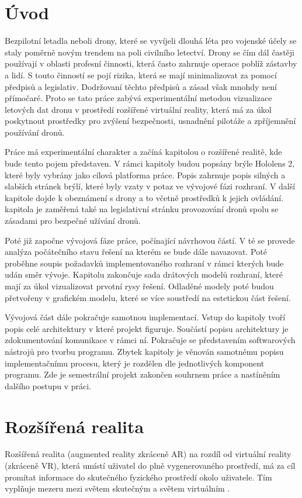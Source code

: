 
\chapter{Úvod}
Bezpilotní letadla neboli drony, které se vyvíjeli dlouhá léta pro vojenské účely se staly poměrně novým trendem na poli civilního letectví. Drony se čím dál častěji používají v oblasti profesní činnosti, která často zahrnuje operace poblíž zástavby a lidí. S touto činností se pojí rizika, která se mají minimalizovat za pomocí předpisů a legislativ. Dodržovaní těchto předpisů a zásad však mnohdy není přímočaré. Proto se tato práce zabývá experimentální metodou vizualizace letových dat dronu v prostředí rozšířené virtuální reality, která má za úkol poskytnout prostředky pro zvýšení bezpečnosti, usnadnění pilotáže a zpříjemnění používání dronů. 

Práce má experimentální charakter a začíná kapitolou o rozšířené realitě, kde bude tento pojem představen. V rámci kapitoly budou popsány brýle Hololens 2, které byly vybrány jako cílová platforma práce. Popis zahrnuje popis silných a slabších stránek brýlí, které byly vzaty v potaz ve vývojové fázi rozhraní. V další kapitole dojde k obeznámení s drony a to včetně prostředků k jejich ovládání. kapitola je zaměřená také na legislativní stránku provozování dronů spolu se zásadami pro bezpečné užívání dronů. 

Poté již započne vývojová fáze práce, počínající návrhovou částí. V té se provede analýza počátečního stavu řešení na kterém se bude dále navazovat. Poté proběhne soupis požadavků implementovaného rozhraní v rámci kterých bude udán směr vývoje. Kapitolu zakončuje sada drátových modelů rozhraní, které mají za úkol vizualizovat prvotní rysy řešení. Odladěné modely poté budou přetvořeny v grafickém modelu, které se více soustředí na estetickou část řešení.

Vývojová část dále pokračuje samotnou implementací. Vstup do kapitoly tvoří popis celé architektury v které projekt figuruje. Součástí popisu architektury je zdokumentování komunikace v rámci ní. Pokračuje se představením softwarových nástrojů pro tvorbu programu. Zbytek kapitoly je věnován samotnému popisu implementačnímu procesu, který je rozdělen dle jednotlivých komponent programu. Zde je semestrální projekt zakončen souhrnem práce a nastíněním dalšího postupu v práci.

\chapter{Rozšířená realita}
Rozšířená realita (augmented reality zkráceně AR) na rozdíl od virtuální reality (zkráceně VR), která umístí uživatel do plně vygenerovaného prostředí, má za cíl promítat informace do skutečného fyzického prostředí okolo uživatele. Tím vyplňuje mezeru mezi světem skutečným a světem virtuálním  \cite{Kniha2SchmalstiegDieter2016Ar:p}.

